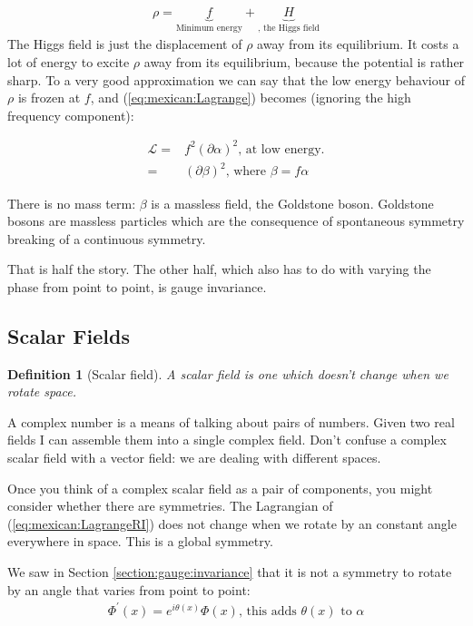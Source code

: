 \documentclass[]{article}
\newtheorem{defn}[thm]{Definition}
\begin{document}
\begin{align*}
	\rho = \underbrace{f}_\text{Minimum energy} + \underbrace{H}_\text{, the Higgs field}
\end{align*}
The Higgs field is just the displacement of $\rho$ away from its equilibrium. It costs a lot of energy to excite $\rho$ away from its equilibrium, because the potential is rather sharp. To a very good approximation we can say that the low energy behaviour of $\rho$ is frozen at $f$, and (\ref{eq:mexican:Lagrange}) becomes (ignoring the high frequency component):

\begin{align*}
	\mathcal{L} =& f^2(\partial \alpha)^2 \text{, at low energy.}\\
	=& (\partial \beta)^2 \text{, where $\beta = f \alpha$}
\end{align*}

There is no mass term: $\beta$ is a massless field, the Goldstone boson. Goldstone bosons are massless particles which are the consequence of spontaneous symmetry breaking of a continuous symmetry.

That is half the story. The other half, which also has to do with varying the phase from point to point, is gauge invariance.
\subsection{Scalar Fields}

\begin{defn}[Scalar field]
	A scalar field is one which doesn't change when we rotate space.
\end{defn}

A complex number is a means of talking about pairs of numbers. Given two real fields I can assemble them into a single complex field. Don't confuse a complex scalar field with a vector field: we are dealing with different spaces.

Once you think of a complex scalar field as a pair of components, you might consider whether there are symmetries. The Lagrangian of (\ref{eq:mexican:LagrangeRI}) does not change when we rotate by an constant angle everywhere in space. This is a global symmetry.

We saw in Section \ref{section:gauge:invariance} that it is not a  symmetry to rotate by an angle that varies from point to point:
\begin{align*}
	\Phi^\prime (x) = e^{i\theta(x)} \Phi(x) \text{, this adds $\theta(x)$ to $\alpha$}
\end{align*}
\end{document}
